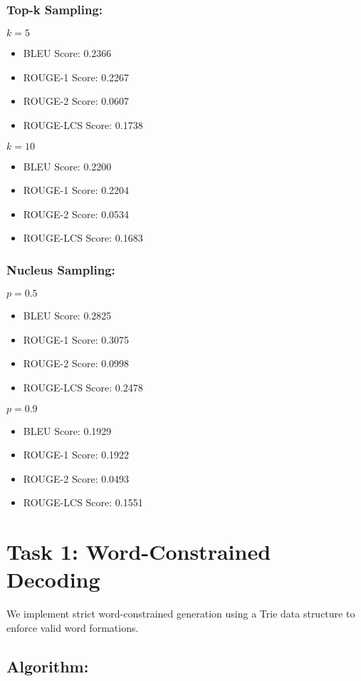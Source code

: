 \documentclass{article}
\begin{document}
\subsubsection{Top-k Sampling:}
$k = 5$
\begin{itemize}
    \item BLEU Score: 0.2366
    \item ROUGE-1 Score: 0.2267
    \item ROUGE-2 Score: 0.0607
    \item ROUGE-LCS Score: 0.1738
\end{itemize}
$k = 10$
\begin{itemize}
    \item BLEU Score: 0.2200
    \item ROUGE-1 Score: 0.2204
    \item ROUGE-2 Score: 0.0534
    \item ROUGE-LCS Score: 0.1683
\end{itemize}

\subsubsection{Nucleus Sampling:}
$p = 0.5$
\begin{itemize}
    \item BLEU Score: 0.2825
    \item ROUGE-1 Score: 0.3075
    \item ROUGE-2 Score: 0.0998
    \item ROUGE-LCS Score: 0.2478
\end{itemize}
$p = 0.9$
\begin{itemize}
    \item BLEU Score: 0.1929
    \item ROUGE-1 Score: 0.1922
    \item ROUGE-2 Score: 0.0493
    \item ROUGE-LCS Score: 0.1551
\end{itemize}

\clearpage
\section{Task 1: Word-Constrained Decoding}
We implement strict word-constrained generation using a Trie data structure to enforce valid word formations.

\subsection{Algorithm:}
\end{document}
